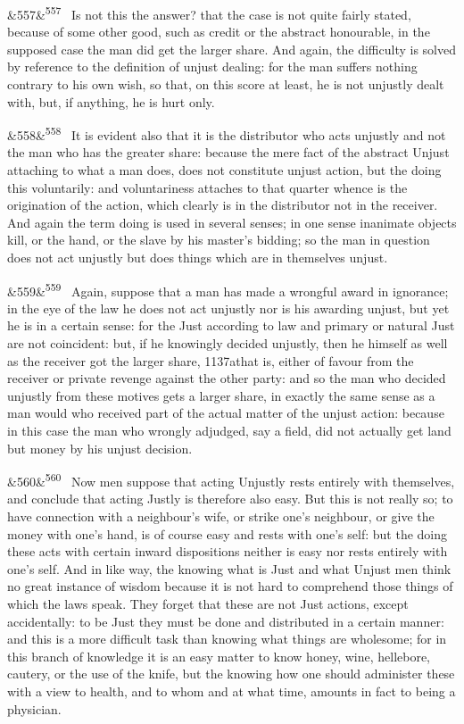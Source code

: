 \documentclass[12pt]{article}
\newcommand{\para}[1][]{\par\noindent\ifx&#1&\else\textsuperscript{\footnotesize #1}~\fi}
\begin{document}
\para[557] Is not this the answer? that the case is not quite fairly stated, because of some other good, such as credit or the abstract honourable, in the supposed case the man did get the larger share. And again, the difficulty is solved by reference to the definition of unjust dealing: for the man suffers nothing contrary to his own wish, so that, on this score at least, he is not unjustly dealt with, but, if anything, he is hurt only.

\para[558] It is evident also that it is the distributor who acts unjustly and not the man who has the greater share: because the mere fact of the abstract Unjust attaching to what a man does, does not constitute unjust action, but the doing this voluntarily: and voluntariness attaches to that quarter whence is the origination of the action, which clearly is in the distributor not in the receiver. And again the term doing is used in several senses; in one sense inanimate objects kill, or the hand, or the slave by his master's bidding; so the man in question does not act unjustly but does things which are in themselves unjust.

\para[559] Again, suppose that a man has made a wrongful award in ignorance; in the eye of the law he does not act unjustly nor is his awarding unjust, but yet he is in a certain sense: for the Just according to law and primary or natural Just are not coincident: but, if he knowingly decided unjustly, then he himself as well as the receiver got the larger share, 1137athat is, either of favour from the receiver or private revenge against the other party: and so the man who decided unjustly from these motives gets a larger share, in exactly the same sense as a man would who received part of the actual matter of the unjust action: because in this case the man who wrongly adjudged, say a field, did not actually get land but money by his unjust decision.

\para[560] Now men suppose that acting Unjustly rests entirely with themselves, and conclude that acting Justly is therefore also easy. But this is not really so; to have connection with a neighbour's wife, or strike one's neighbour, or give the money with one's hand, is of course easy and rests with one's self: but the doing these acts with certain inward dispositions neither is easy nor rests entirely with one's self. And in like way, the knowing what is Just and what Unjust men think no great instance of wisdom because it is not hard to comprehend those things of which the laws speak. They forget that these are not Just actions, except accidentally: to be Just they must be done and distributed in a certain manner: and this is a more difficult task than knowing what things are wholesome; for in this branch of knowledge it is an easy matter to know honey, wine, hellebore, cautery, or the use of the knife, but the knowing how one should administer these with a view to health, and to whom and at what time, amounts in fact to being a physician.
\end{document}
